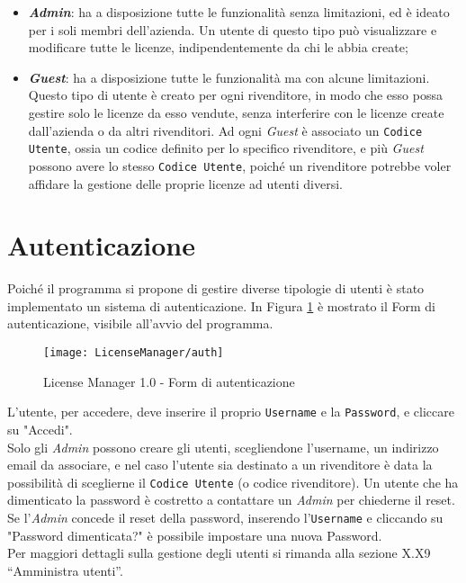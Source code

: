 \begin{itemize}
\item \textbf{\textit{Admin}}: ha a disposizione tutte le funzionalità senza limitazioni, ed è ideato per i soli membri dell’azienda. Un utente di questo tipo può visualizzare e modificare tutte le licenze, indipendentemente da chi le abbia create;

\item \textbf{\textit{Guest}}: ha a disposizione tutte le funzionalità ma con alcune limitazioni. Questo tipo di utente è creato per ogni rivenditore, in modo che esso possa gestire solo le licenze da esso vendute, senza interferire con le licenze create dall’azienda o da altri rivenditori. Ad ogni \textit{Guest} è associato un \texttt{Codice Utente}, ossia un codice definito per lo specifico rivenditore, e più \textit{Guest} possono avere lo stesso \texttt{Codice Utente}, poiché un rivenditore potrebbe voler affidare la gestione delle proprie licenze ad utenti diversi.
\end{itemize}


\section{Autenticazione}
Poiché il programma si propone di gestire diverse tipologie di utenti è stato implementato un sistema di autenticazione. In Figura \ref{auth} è mostrato il Form di autenticazione, visibile all'avvio del programma.

\begin{figure}[!h] 
    \centering 
    \texttt{[image: LicenseManager/auth]} 
    \caption{License Manager 1.0 - Form di autenticazione}
    \label{auth}
\end{figure}

L’utente, per accedere, deve inserire il proprio \texttt{Username} e la \texttt{Password}, e cliccare su "Accedi".\\
Solo gli \textit{Admin} possono creare gli utenti, scegliendone l’username, un indirizzo email da associare, e nel caso l’utente sia destinato a un rivenditore è data la possibilità di sceglierne il \texttt{Codice Utente} (o codice rivenditore).
Un utente che ha dimenticato la password è costretto a contattare un \textit{Admin} per chiederne il reset. Se l’\textit{Admin} concede il reset della password, inserendo l’\texttt{Username} e cliccando su "Password dimenticata?" è possibile impostare una nuova Password.\\
Per maggiori dettagli sulla gestione degli utenti si rimanda alla sezione X.X9 “Amministra utenti”.
\newpage


